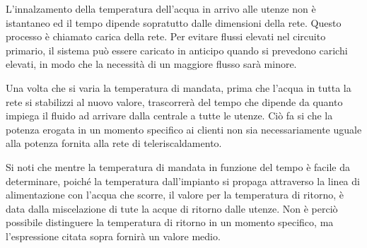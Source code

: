 \documentclass[laurea,oneside,11pt]{USiena_tesiLM}
\begin{document}
L'innalzamento della temperatura dell'acqua in arrivo alle utenze non è istantaneo ed il tempo dipende sopratutto dalle dimensioni della rete. Questo processo è chiamato carica della rete. Per evitare flussi elevati nel circuito primario, il sistema può essere caricato in anticipo quando si prevedono carichi elevati, in modo che la necessità di un maggiore flusso sarà minore.

Una volta che si varia la temperatura di mandata, prima che l'acqua in tutta la rete si stabilizzi al nuovo valore, trascorrerà del tempo che dipende da quanto  impiega il fluido ad arrivare dalla centrale a tutte le utenze. Ciò fa si che la potenza erogata in un momento specifico ai clienti non sia necessariamente uguale alla potenza fornita alla rete di teleriscaldamento.

%

Si noti che mentre la temperatura di mandata in funzione del tempo è facile da determinare, poiché la temperatura dall'impianto si propaga attraverso la linea di alimentazione con l'acqua che scorre, il valore per la temperatura di ritorno, è data dalla miscelazione di tute la acque di ritorno dalle utenze. Non è perciò possibile distinguere la temperatura di ritorno in un momento specifico, ma l'espressione citata sopra fornirà un valore medio.
\end{document}
